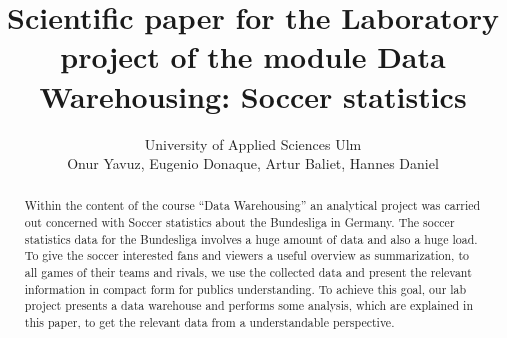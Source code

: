 \documentclass[11pt, journal]{IEEEtran}
\begin{document}
%
\title{Scientific paper for the Laboratory project of the module 
Data Warehousing: Soccer statistics 
}
%
%
%

\author{ \parbox{3 in}{\centering  University of Applied Sciences Ulm\\
         {Onur Yavuz, Eugenio Donaque, Artur Baliet, Hannes Daniel}}
}









\maketitle

\begin{abstract}
Within the content of the course “Data Warehousing” an analytical project was carried out concerned with Soccer statistics about the Bundesliga in Germany. The soccer statistics data for the Bundesliga involves a huge amount of data and also a huge load. To give the soccer interested fans and viewers a useful overview as summarization, to all games of their teams and rivals, we use the collected data and present the relevant information in compact form for publics understanding. To achieve this goal, our lab project presents a data warehouse and performs some analysis, which are explained in this paper, to get the relevant data from a understandable perspective.
\end{abstract}
\end{document}
